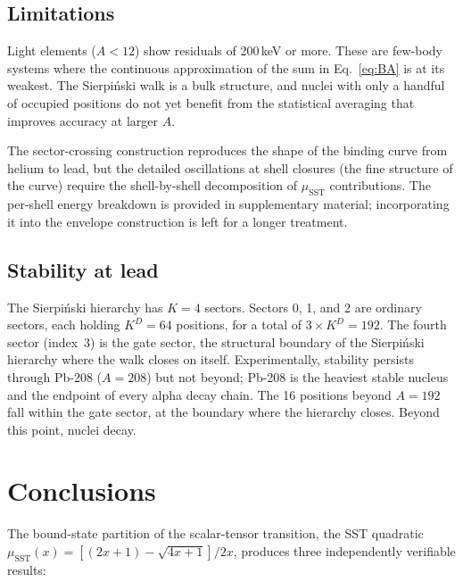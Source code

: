 \documentclass[fleqn,usenatbib]{mnras}
\begin{document}
\subsection{Limitations}

Light elements ($A < 12$) show residuals of 200\,keV or more. These are few-body systems where the continuous approximation of the sum in Eq.~\ref{eq:BA} is at its weakest. The Sierpi\'nski walk is a bulk structure, and nuclei with only a handful of occupied positions do not yet benefit from the statistical averaging that improves accuracy at larger $A$.

The sector-crossing construction reproduces the shape of the binding curve from helium to lead, but the detailed oscillations at shell closures (the fine structure of the curve) require the shell-by-shell decomposition of $\mu_{\mathrm{SST}}$ contributions. The per-shell energy breakdown is provided in supplementary material; incorporating it into the envelope construction is left for a longer treatment.

\subsection{Stability at lead}

The Sierpi\'nski hierarchy has $K = 4$ sectors. Sectors 0, 1, and 2 are ordinary sectors, each holding $K^D = 64$ positions, for a total of $3 \times K^D = 192$. The fourth sector (index~3) is the gate sector, the structural boundary of the Sierpi\'nski hierarchy where the walk closes on itself. Experimentally, stability persists through Pb-208 ($A = 208$) but not beyond; Pb-208 is the heaviest stable nucleus and the endpoint of every alpha decay chain. The 16 positions beyond $A = 192$ fall within the gate sector, at the boundary where the hierarchy closes. Beyond this point, nuclei decay.

\section{Conclusions}
\label{sec:conclusions}

The bound-state partition of the scalar-tensor transition, the SST quadratic $\mu_{\mathrm{SST}}(x) = [(2x+1) - \sqrt{4x+1}]/2x$, produces three independently verifiable results:
\end{document}
